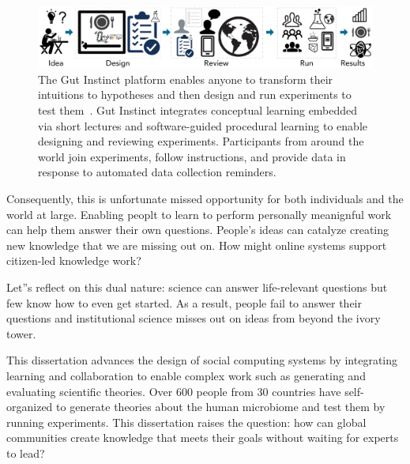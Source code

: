 \begin{figure}[b] 
  \centering
  \includegraphics[width=1.0\textwidth]{figures/intro/intro-1}
  \caption[The Gut Instinct platform enables anyone to transform their intuitions to hypotheses 
and then design and run experiments to test them]
{The Gut Instinct platform enables anyone to transform their intuitions to hypotheses 
and then design and run experiments to test them~\cite{Pandey, Pandey2017,Pandey2018}. Gut Instinct integrates 
conceptual learning embedded via short lectures and software-guided procedural 
learning to enable designing and reviewing experiments. Participants from around
 the world join experiments, follow instructions, and provide data in response to 
automated data collection reminders. }
  \label{fig:intro-1}
\end{figure}

Consequently, this is unfortunate missed opportunity for both individuals and the world at large. Enabling peoplt to learn to perform personally meanignful work can help them answer their own questions. People's ideas can catalyze creating new knowledge that we are missing out on.  How might online systems support citizen-led knowledge work? 

Let''s reflect on this dual nature:  science can answer life-relevant questions but few know how to even get started. As a result, people fail to answer their questions and institutional science misses out on ideas from beyond the ivory tower. 





This dissertation advances the design of social computing systems by integrating learning and collaboration to enable complex work such as generating and evaluating scientific theories. Over 600 people from 30 countries have self-organized to generate theories about the human microbiome and test them by running experiments. This dissertation raises the question: how can global communities create knowledge that meets their goals without waiting for experts to lead? 

